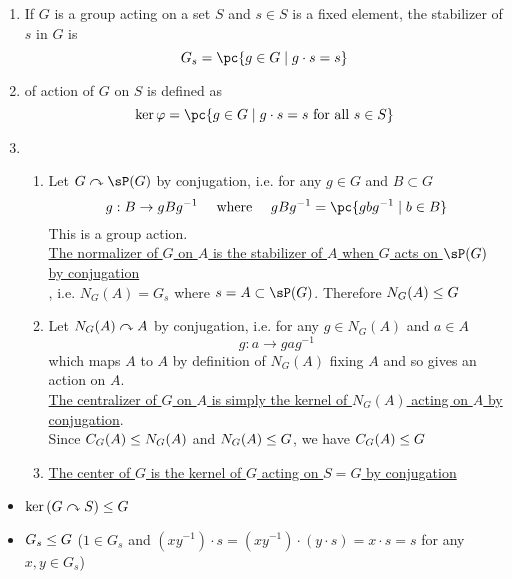 \documentclass[11pt]{article}
\begin{document}
\begin{definition*}
    \begin{enumerate}
        \item {} If $G$ is a group acting on a set $S$ and $s\in S$ is a fixed element, the stabilizer of $s$ in $G$ is 
        \[
            G_s = \pc{g\in G \mid g\cdot s = s}    
        \]
        \item {} of action of $G$ on $S$ is defined as 
        \[
            \ker{\varphi} = \pc{
                g\in G \mid g\cdot s = s \text{ for all } s\in S
            }
        \]
        \item {}
        \begin{enumerate}
            \item {} Let $G\actson \sP(G)$ by conjugation, i.e. for any $g\in G$ and $B\subset G$
            \[
                g: B \to gBg^{-1} 
                \quad \text{ where } \quad
                gBg^{-1} = \pc{gbg^{-1} \mid b\in B}
            \]
            This is a group action. \\ 
            \underline{The normalizer of $G$ on $A$ is the stabilizer of $A$ when $G$ acts on $\sP(G)$ by conjugation} \\
            , i.e. $N_G(A) = G_s$ where $s=A\subset \sP(G)$. Therefore $N_G(A) \leq G$
            \item {} Let $N_G(A) \curvearrowright A$ by conjugation, i.e. for any $g\in N_G(A)$ and $a\in A$
            \[
                g: a\to gag^{-1}    
            \]
            which maps $A$ to $A$ by definition of $N_G(A)$ fixing $A$ and so gives an action on $A$. \\  \underline{The centralizer of $G$ on $A$ is simply the kernel of $N_G(A)$ acting on $A$ by conjugation}. 
            \\ Since $C_G(A)\leq N_G(A)$ and $N_G(A)\leq G$, we have $C_G(A)\leq G$
            \item {} \underline{The center of $G$ is the kernel of $G$ acting on $S=G$ by conjugation}
        \end{enumerate} 
    \end{enumerate}
    \begin{itemize}
        \item {} $\ker{(G\ensuremath{\curvearrowright}S)} \leq G$
        \item {} $G_s \leq G$ ($1\in G_s$ and $(xy^{-1}) \cdot s = (xy^{-1}) \cdot (y\cdot s) = x\cdot s = s$ for any $x,y\in G_s$)

\end{itemize}
\end{definition*}
\end{document}
